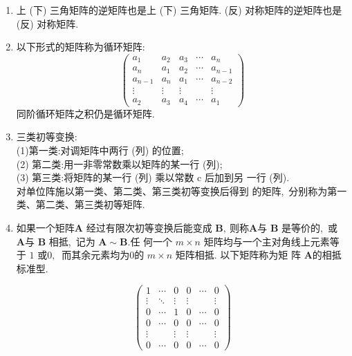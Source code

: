 \begin{enumerate}
		\item 上 (下) 三角矩阵的逆矩阵也是上 (下) 三角矩阵.
		(反) 对称矩阵的逆矩阵也是 (反) 对称矩阵.
		\item 以下形式的矩阵称为循环矩阵:
		$$
		\left(\begin{array}{ccccc}
			a_{1} & a_{2} & a_{3} & \cdots & a_{n} \\
			a_{n} & a_{1} & a_{2} & \cdots & a_{n-1} \\
			a_{n-1} & a_{n} & a_{1} & \cdots & a_{n-2} \\
			\vdots & \vdots & \vdots & & \vdots \\
			a_{2} & a_{3} & a_{4} & \cdots & a_{1}
		\end{array}\right)$$
		同阶循环矩阵之积仍是循环矩阵.
		\item 三类初等变换:\\
		(1)第一类:对调矩阵中两行 (列) 的位置;\\
		(2) 第二类:用一非零常数乘以矩阵的某一行 (列);\\
		(3) 第三类:将矩阵的某一行 (列) 乘以常数  c  后加到另 一行 (列).\\
		对单位阵施以第一类、第二类、第三类初等变换后得到 的矩阵,\  分别称为第一类、第二类、第三类初等矩阵.
		\item 如果一个矩阵$  \boldsymbol{A} $ 经过有限次初等变换后能变成  $\boldsymbol{B} ,\  $则称$  \boldsymbol{A}  $与  $\boldsymbol{B}  $ 是等价的,\  或 $ \boldsymbol{A}  $与  $\boldsymbol{B}  $ 相抵,\  记为  $\boldsymbol{A} \sim \boldsymbol{B} . $任 何一个 $ m \times n $ 矩阵均与一个主对角线上元素等于 $1$ 或$ 0 ,\ $ 而其余元素均为$ 0 $的  $m \times n $ 矩阵相抵. 以下矩阵称为矩 阵 $ \boldsymbol{A}   $的相抵标准型.
		
		$$\left(\begin{array}{cccccc}
			1 & \cdots & 0 & 0 & \cdots & 0 \\
			\vdots & \ddots & \vdots & \vdots & & \vdots \\
			0 & \cdots & 1 & 0 & \cdots & 0 \\
			0 & \cdots & 0 & 0 & \cdots & 0 \\
			\vdots & & \vdots & \vdots & & \vdots \\
			0 & \cdots & 0 & 0 & \cdots & 0
		\end{array}\right)$$
		

\end{enumerate}
